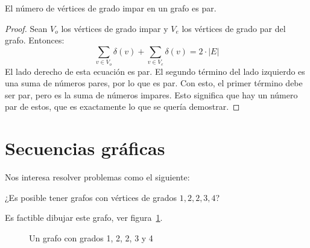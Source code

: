   \begin{lemma}[Handshaking]
    \label{lem:handshaking}
    El número de vértices de grado impar en un grafo es par.
  \end{lemma}
  \begin{proof}
    Sean \(V_o\) los vértices de grado impar
    y \(V_e\) los vértices de grado par del grafo.
    Entonces:
    \begin{equation*}
      \sum_{v \in V_o} \delta(v) + \sum_{v \in V_e} \delta(v)
	= 2 \cdot \lvert E \rvert
    \end{equation*}
    El lado derecho de esta ecuación es par.
    El segundo término del lado izquierdo
    es una suma de números pares,
    por lo que es par.
    Con esto,
    el primer término debe ser par,
    pero es la suma de números impares.
    Esto significa que hay un número par de estos,
    que es exactamente lo que se quería demostrar.
  \end{proof}

\section{Secuencias gráficas}
\label{sec:secuencias-graficas}

  Nos interesa resolver problemas como el siguiente:
  \begin{example}
    ¿Es posible tener grafos con vértices
    de grados \(1, 2, 2, 3, 4\)?

    Es factible dibujar este grafo,
    ver figura~\ref{fig:12234}.
    \begin{figure}[htbp]
      \centering
      \caption{Un grafo con grados 1, 2, 2, 3 y 4}
      \label{fig:12234}
    \end{figure}
  \end{example}


